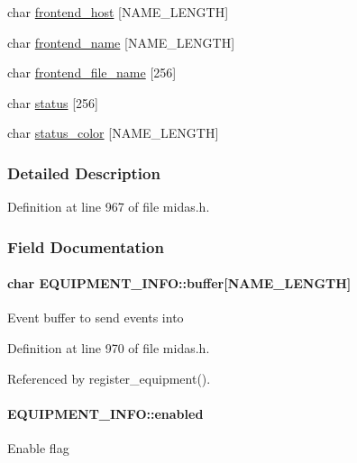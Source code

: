 \begin{DoxyCompactItemize}
\item 
char \hyperlink{structEQUIPMENT__INFO_a0f7f20fef7826740571d2ffa82da4dfd}{frontend\_\-host} \mbox{[}NAME\_\-LENGTH\mbox{]}
\item 
char \hyperlink{structEQUIPMENT__INFO_a2cfd04e323109fe1cbb75ca8047aaa77}{frontend\_\-name} \mbox{[}NAME\_\-LENGTH\mbox{]}
\item 
char \hyperlink{structEQUIPMENT__INFO_a0788ebd106c11c952e09f99e142d8bbf}{frontend\_\-file\_\-name} \mbox{[}256\mbox{]}
\item 
char \hyperlink{structEQUIPMENT__INFO_a0c629c9353558e8f2f1759357608ebb6}{status} \mbox{[}256\mbox{]}
\item 
char \hyperlink{structEQUIPMENT__INFO_acfbe0f2e23fe95a1a06d55d6e0d3ac9c}{status\_\-color} \mbox{[}NAME\_\-LENGTH\mbox{]}
\end{DoxyCompactItemize}


\subsubsection{Detailed Description}


Definition at line 967 of file midas.h.

\subsubsection{Field Documentation}
\paragraph[{buffer}]{\setlength{\rightskip}{0pt plus 5cm}char {\bf EQUIPMENT\_\-INFO::buffer}\mbox{[}NAME\_\-LENGTH\mbox{]}}\hfill\label{structEQUIPMENT__INFO_a0666cb14ec61ae2c4f535b76c9401ae1}
Event buffer to send events into 

Definition at line 970 of file midas.h.

Referenced by register\_\-equipment().
\paragraph[{enabled}]{ {\bf EQUIPMENT\_\-INFO::enabled}}\hfill\label{structEQUIPMENT__INFO_a512d7966d5f96f8c75fec4ba1b1946c4}
Enable flag 

